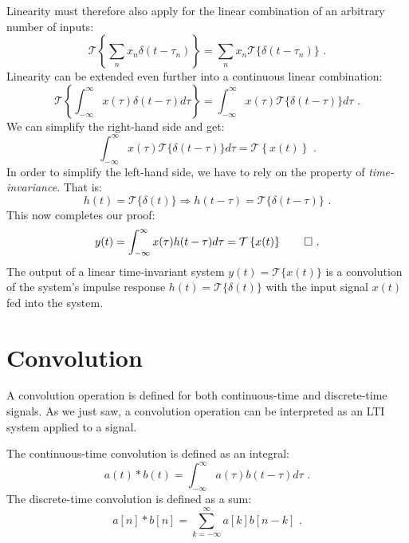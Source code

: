 Linearity must therefore also apply for the linear combination of an arbitrary number of inputs:
\begin{equation}
\mathcal{T}\left\{\sum_n x_n \delta(t-\tau_n)\right\} = \sum_n x_n \mathcal{T}\{\delta(t-\tau_n)\}\,\,.
\end{equation}
Linearity can be extended even further into a continuous linear combination:
\begin{equation}
\mathcal{T}\left\{\int_{-\infty}^{\infty} x(\tau)\delta(t-\tau)d\tau\right\} = \int_{-\infty}^{\infty} x(\tau) \mathcal{T}\{\delta(t-\tau)\} d\tau\,\,.
\end{equation}
We can simplify the right-hand side and get:
\begin{equation}
\int_{-\infty}^{\infty} x(\tau) \mathcal{T}\{\delta(t-\tau)\} d\tau = \mathcal{T}\left\{x(t)\right\}\,\,.
\end{equation}
In order to simplify the left-hand side, we have to rely on the property of \emph{time-invariance}. That is:
\begin{equation}
h(t) = \mathcal{T}\{\delta(t)\} \Rightarrow h(t-\tau) = \mathcal{T}\{\delta(t-\tau)\}\,\,.
\end{equation}
This now completes our proof:
\begin{equation}
y(t)=\int_{-\infty}^{\infty} x(\tau) h(t-\tau) d\tau = \mathcal{T}\left\{x(t)\right\}\qed\,\,.
\end{equation}
The output of a linear time-invariant system $y(t)=\mathcal{T}\{x(t)\}$ is a convolution of the system's 
impulse response $h(t)=\mathcal{T}\{\delta(t)\}$ with the input signal $x(t)$ fed into the system.

\section{Convolution}

A convolution operation is defined for both continuous-time and
discrete-time signals. As we just saw, a convolution operation can be
interpreted as an LTI system applied to a signal.

The continuous-time convolution is defined as an integral:
\begin{equation}
\boxed{
  a(t)*b(t) = \int_{-\infty}^{\infty}a(\tau)b(t-\tau)d\tau\,\,.
}
\end{equation}
The discrete-time convolution is defined as a sum:
\begin{equation}
\boxed{
  a[n]*b[n] = \sum_{k=-\infty}^{\infty}a[k]b[n-k]\,\,.
}
\end{equation}

